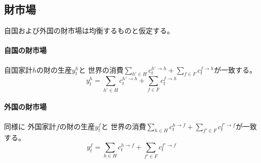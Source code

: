 
\subsection{財市場}
\label{sec:chapter3_assumptions_goods_markets}
自国および外国の財市場は均衡するものと仮定する。

\paragraph{自国の財市場}
\label{sec:chapter3_assumptions_goods_markets_home}
自国家計\(h\)の財の生産\(y_t^h\)と
世界の消費\(\sum_{h'\in H}c_t^{h'\to h}+\sum_{f\in F}c_t^{f\to h}\)が一致する。
\begin{equation}
\label{form:chapter3_assumptions_goods_markets_home_eq}
    y_t^h=\sum_{h'\in H}c_t^{h'\to h}+\sum_{f\in F}c_t^{f\to h}
\end{equation}

\paragraph{外国の財市場}
\label{sec:chapter3_assumptions_goods_markets_foreign}
同様に
外国家計\(f\)の財の生産\(y_t^f\)と
世界の消費\(\sum_{h\in H}c_t^{h\to f}+\sum_{f'\in F}c_t^{f'\to f}\)が一致する。
\begin{equation}
\label{form:chapter3_assumptions_goods_markets_foreign_eq}
    y_t^f=\sum_{h\in H}c_t^{h\to f}+\sum_{f'\in F}c_t^{f'\to f}
\end{equation}